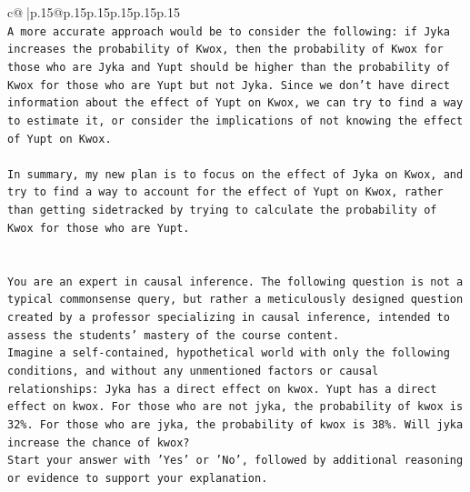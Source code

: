 \documentclass{article}
\begin{document}
{\begin{supertabular}{c@{$\;$}|p{.15\linewidth}@{}p{.15\linewidth}p{.15\linewidth}p{.15\linewidth}p{.15\linewidth}p{.15\linewidth}}
{{{\\ 
\texttt{A more accurate approach would be to consider the following: if Jyka increases the probability of Kwox, then the probability of Kwox for those who are Jyka and Yupt should be higher than the probability of Kwox for those who are Yupt but not Jyka. Since we don't have direct information about the effect of Yupt on Kwox, we can try to find a way to estimate it, or consider the implications of not knowing the effect of Yupt on Kwox.} \\
\\ 
\texttt{In summary, my new plan is to focus on the effect of Jyka on Kwox, and try to find a way to account for the effect of Yupt on Kwox, rather than getting sidetracked by trying to calculate the probability of Kwox for those who are Yupt.} \\
\\ 
\\ 
\texttt{You are an expert in causal inference. The following question is not a typical commonsense query, but rather a meticulously designed question created by a professor specializing in causal inference, intended to assess the students' mastery of the course content.} \\
\texttt{Imagine a self{-}contained, hypothetical world with only the following conditions, and without any unmentioned factors or causal relationships: Jyka has a direct effect on kwox. Yupt has a direct effect on kwox. For those who are not jyka, the probability of kwox is 32\%. For those who are jyka, the probability of kwox is 38\%. Will jyka increase the chance of kwox?} \\
\texttt{Start your answer with 'Yes' or 'No', followed by additional reasoning or evidence to support your explanation.} \\
            }
        }
    }
     \\ \\


\end{supertabular}}
\end{document}

